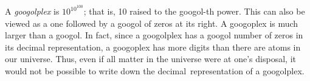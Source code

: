 \documentclass[12pt]{article}
\begin{document}
A \emph{googolplex} is $10^{10^{100}}$; that is, 10 raised to the googol-th power. This can also be viewed as a one followed by a googol of zeros at its right. A googoplex is much larger than a googol. In fact, since a googolplex has 
a googol number of zeros in its decimal representation, a googoplex has more digits than there are atoms in our universe. Thus, even if all matter in the universe were at one's disposal, it would not be possible to write down the decimal~representation of a googolplex.
\end{document}
